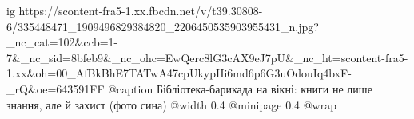  
 
 
 
 

\ifcmt
  ig https://scontent-fra5-1.xx.fbcdn.net/v/t39.30808-6/335448471_1909496829384820_2206450535903955431_n.jpg?_nc_cat=102&ccb=1-7&_nc_sid=8bfeb9&_nc_ohc=EwQerc8lG3cAX9eJ7pU&_nc_ht=scontent-fra5-1.xx&oh=00_AfBkBhE7TATwA47cpUkypHi6md6p6G3uOdouIq4bxF-_rQ&oe=643591FF
	@caption Бібліотека-барикада на вікні: книги не лише знання, але й захист (фото сина)
  @width 0.4
  @minipage 0.4
  @wrap \parpic[r]
\fi
